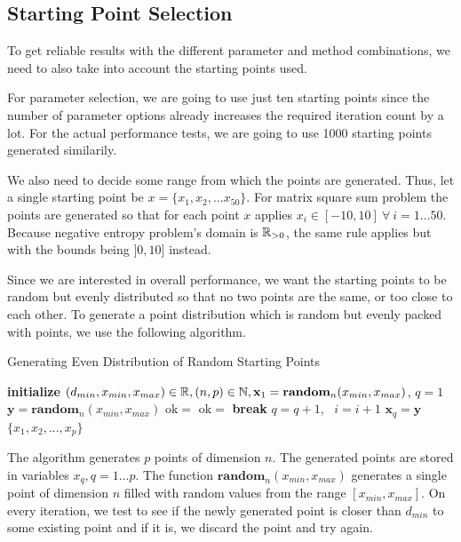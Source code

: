 \documentclass[a4paper,english,titlepage,12pt]{article}
\newcommand{\vect}[1]{\ensuremath{\mathbf{#1}}}
\newcommand{\norm}[1]{\ensuremath\Vert #1 \Vert}
\newcommand{\R}{\ensuremath\mathbb{R}}
\newcommand{\N}{\ensuremath\mathbb{N}}
\begin{document}
\subsection{Starting Point Selection}

To get reliable results with the different parameter and method combinations, we need to also take into account the starting points used.

For parameter selection, we are going to use just ten starting points since the number of parameter options already increases the required iteration count by a lot. For the actual performance tests, we are going to use 1000 starting points generated similarily.

We also need to decide some range from which the points are generated. Thus, let a single starting point be $x = \{x_1, x_2, \dots x_{50}\}$. For matrix square sum problem the points are generated so that for each point $x$ applies $x_i \in  [-10, 10]\ \forall\ i = 1 \dots 50$. Because negative entropy problem's domain is $\R_{>0}$, the same rule applies but with the bounds being $]0, 10]$ instead.

Since we are interested in overall performance, we want the starting points to be random but evenly distributed so that no two points are the same, or too close to each other. To generate a point distribution which is random but evenly packed with points, we use the following algorithm.

\begin{algorithm}[H]
\caption{Generating Even Distribution of Random Starting Points}
\label{alg_x0_distribution}
\begin{algorithmic}[1]
\STATE \textbf{initialize} $(d_{min}, x_{min}, x_{max}) \in \R, (n, p) \in \N, \vect{x}_1 = \mathbf{random}_{n}(x_{min}, x_{max})$, $q = 1$
    \STATE $\vect{y} = \mathbf{random}_{n}(x_{min}, x_{max})$
    \STATE $\mathrm{ok} =$ \TRUE
        \IF{$\norm{\vect{x}_j - \vect{y}} < d_{min}$}
            \STATE $\mathrm{ok} = $ \FALSE
            \STATE \textbf{break}
        \ENDIF
    \ENDFOR
        \STATE $q = q + 1$, \ $i = i + 1$
        \STATE $\vect{x}_q = \vect{y}$
    \ENDIF
\ENDWHILE
\RETURN $\{ x_1, x_2, ..., x_p\}$
\end{algorithmic}
\end{algorithm}

The algorithm generates $p$ points of dimension $n$. The generated points are stored in variables $x_q, q = 1 \dots p$. The function $\mathbf{random}_n(x_{min}, x_{max})$ generates a single point of dimension $n$ filled with random values from the range $[x_{min}, x_{max}]$. On every iteration, we test to see if the newly generated point is closer than $d_{min}$ to some existing point and if it is, we discard the point and try again.
\end{document}

